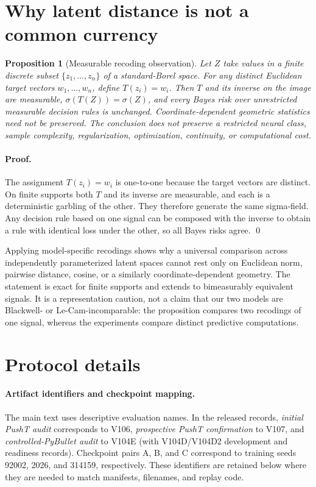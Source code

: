 \documentclass[10pt]{article}
\newtheorem{proposition}{Proposition}
\theoremstyle{definition}
\theoremstyle{remark}
\begin{document}
\section{Why latent distance is not a common currency}

\begin{proposition}[Measurable recoding observation]
\label{prop:coordinates}
Let $Z$ take values in a finite discrete subset
$\{z_1,\ldots,z_n\}$ of a standard-Borel space.  For any distinct Euclidean
target vectors $w_1,\ldots,w_n$, define $T(z_i)=w_i$.  Then $T$ and its inverse
on the image are measurable, $\sigma(T(Z))=\sigma(Z)$, and every Bayes risk
over unrestricted measurable decision rules is unchanged.  Coordinate-dependent
geometric statistics need not be preserved.  The conclusion does not preserve
a restricted neural class, sample complexity, regularization, optimization,
continuity, or computational cost.
\end{proposition}

\paragraph{Proof.}
The assignment $T(z_i)=w_i$ is one-to-one because the target vectors are
distinct.  On finite supports both $T$ and its inverse are measurable, and
each is a deterministic garbling of the other.  They therefore generate the
same sigma-field.  Any decision rule based on one signal can be composed with
the inverse to obtain a rule with identical loss under the other, so all Bayes
risks agree. \qed

Applying model-specific recodings shows why a universal comparison across
independently parameterized latent spaces cannot rest only on Euclidean norm,
pairwise distance, cosine, or a similarly coordinate-dependent geometry.  The
statement is exact for finite supports and extends to bimeasurably equivalent
signals.  It is a representation caution, not a claim that our two models are
Blackwell- or Le-Cam-incomparable: the proposition compares two recodings of
one signal, whereas the experiments compare distinct predictive computations.

\section{Protocol details}
\label{sec:artifact-map}
\paragraph{Artifact identifiers and checkpoint mapping.}
The main text uses descriptive evaluation names.  In the released records,
\emph{initial PushT audit} corresponds to V106, \emph{prospective PushT
confirmation} to V107, and \emph{controlled-PyBullet audit} to V104E (with
V104D/V104D2 development and readiness records).  Checkpoint pairs A, B, and C
correspond to training seeds 92002, 2026, and 314159, respectively.  These
identifiers are retained below where they are needed to match manifests,
filenames, and replay code.
\end{document}
